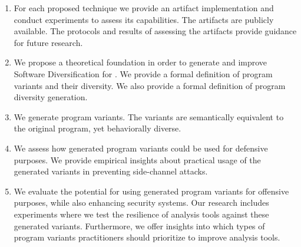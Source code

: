 \begin{enumerate}[label=\textbf{C\arabic*}, ref=C\arabic*]
	\item \label{methodcontrib}  For each proposed technique we provide an artifact implementation and conduct experiments to assess its capabilities. The artifacts are publicly available. The protocols and results of assessing the artifacts provide guidance for future research.
	
	\item \label{therycontrib}  We propose a theoretical foundation in order to generate and improve Software Diversification for \Wasm. We provide a formal definition of \Wasm program variants and their diversity. We also provide a formal definition of \Wasm program diversity generation.
	
	\item \label{generationcontrib}  We generate \Wasm program variants. The variants are semantically equivalent to the original program, yet behaviorally diverse.
	
	\item \label{defensivecontrib}  We assess how generated \Wasm program variants could be used for defensive purposes. We provide empirical insights about practical usage of the generated variants in preventing side-channel attacks.
	
	\item \label{ofensivecontrib}  
	We evaluate the potential for using generated \Wasm program variants for offensive purposes, while also enhancing security systems. 
	Our research includes experiments where we test the resilience of \Wasm analysis tools against these generated variants. 
	Furthermore, we offer insights into which types of program variants practitioners should prioritize to improve \Wasm analysis tools.

	
\end{enumerate}

